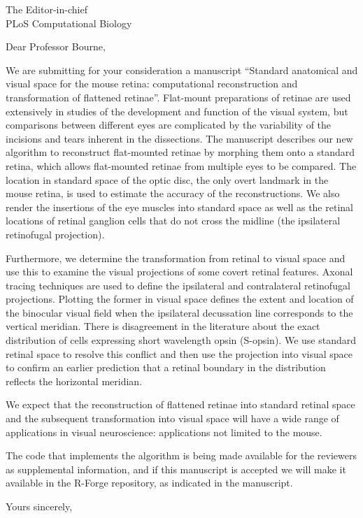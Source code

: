 \documentclass[IANC,11pt]{infletr}
\begin{document}
\begin{letter}{The Editor-in-chief\\
    PLoS Computational Biology
}

\opening{Dear Professor Bourne,}

We are submitting for your consideration a manuscript ``Standard
anatomical and visual space for the mouse retina: computational
reconstruction and transformation of flattened retinae''.  Flat-mount
preparations of retinae are used extensively in studies of the
development and function of the visual system, but comparisons between
different eyes are complicated by the variability of the incisions and
tears inherent in the dissections. The manuscript describes our new
algorithm to reconstruct flat-mounted retinae by morphing them onto a
standard retina, which allows flat-mounted retinae from multiple eyes
to be compared. The location in standard space of the optic disc, the
only overt landmark in the mouse retina, is used to estimate the
accuracy of the reconstructions. We also render the insertions of the
eye muscles into standard space as well as the retinal locations of
retinal ganglion cells that do not cross the midline (the ipsilateral
retinofugal projection).


Furthermore, we determine the transformation from retinal to visual
space and use this to examine the visual projections of some covert
retinal features. Axonal tracing techniques are used to define the
ipsilateral and contralateral retinofugal projections. Plotting the
former in visual space defines the extent and location of the
binocular visual field when the ipsilateral decussation line
corresponds to the vertical meridian. There is disagreement in the
literature about the exact distribution of cells expressing short
wavelength opsin (S-opsin). We use standard retinal space to resolve
this conflict and then use the projection into visual space to confirm
an earlier prediction that a retinal boundary in the distribution
reflects the horizontal meridian.

We expect that the reconstruction of flattened retinae into standard
retinal space and the subsequent transformation into visual space will
have a wide range of applications in visual neuroscience: applications
not limited to the mouse.

The code that implements the algorithm is being made available for the
reviewers as supplemental information, and if this manuscript is
accepted we will make it available in the R-Forge repository, as
indicated in the manuscript.

\closing{Yours sincerely,}

\end{letter}
\end{document}
